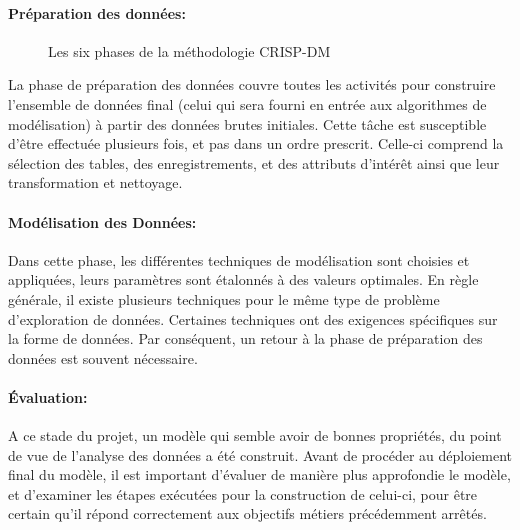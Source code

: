 	\paragraph{Préparation des données:}
	\begin{figure}
	\raggedleft
	\caption{Les six phases de la méthodologie CRISP-DM}
	\label{fig:crisp}
	\end{figure}
	La phase de préparation des données couvre toutes les activités pour construire l'ensemble de données final (celui qui sera fourni en entrée aux algorithmes de modélisation) à partir des données brutes initiales. Cette tâche est susceptible d'être effectuée plusieurs fois, et pas dans un ordre prescrit. Celle-ci comprend la sélection des tables, des enregistrements, et des attributs d’intérêt ainsi que leur transformation et nettoyage.
	\paragraph{Modélisation des Données:}
	Dans cette phase, les différentes techniques de modélisation sont choisies et appliquées, leurs paramètres sont étalonnés à des valeurs optimales. En règle générale, il existe plusieurs techniques pour le même type de problème d'exploration de données. Certaines techniques ont des exigences spécifiques sur la forme de données. Par conséquent, un retour à la phase de préparation des données est souvent nécessaire.
	\paragraph{Évaluation:}
	A ce stade du projet, un modèle qui semble avoir de bonnes propriétés, du point de vue de l'analyse des données a été construit. Avant de procéder au déploiement final du modèle, il est important d'évaluer de manière plus approfondie le modèle, et d'examiner les étapes exécutées pour la construction de celui-ci, pour être certain qu'il répond correctement aux objectifs métiers précédemment arrêtés.
